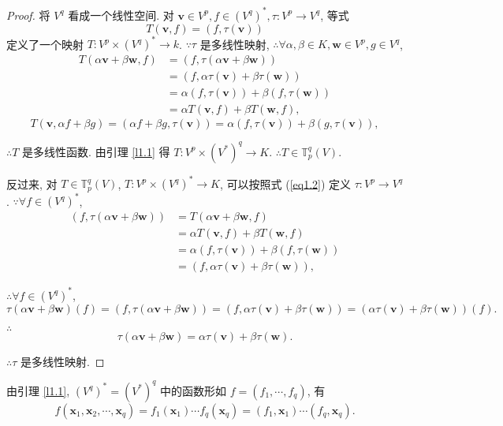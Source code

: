 \documentclass{ctexart}
\begin{document}
\begin{proof}
    将 $V^q$ 看成一个线性空间. 对 $\boldsymbol{v}\in V^p,f\in(V^q)^*,\tau:V^p\to V^q$, 等式
    \begin{equation}\label{eq1.2}
        T(\boldsymbol{v},f)=(f,\tau(\boldsymbol{v}))
    \end{equation}
    定义了一个映射 $T:V^p\times(V^q)^*\to k$. $\because\tau$ 是多线性映射, $\therefore\forall\alpha,\beta\in K,\boldsymbol{w}\in V^p,g\in V^q$,
    \begin{align*}
        T(\alpha\boldsymbol{v}+\beta\boldsymbol{w},f) & =(f,\tau(\alpha\boldsymbol{v}+\beta\boldsymbol{w})) \\
        & =(f,\alpha\tau(\boldsymbol{v})+\beta\tau(\boldsymbol{w})) \\
        & =\alpha(f,\tau(\boldsymbol{v}))+\beta(f,\tau(\boldsymbol{w})) \\
        & =\alpha T(\boldsymbol{v},f)+\beta T(\boldsymbol{w},f),
    \end{align*}
    \[T(\boldsymbol{v},\alpha f+\beta g)=(\alpha f+\beta g,\tau(\boldsymbol{v}))=\alpha(f,\tau(\boldsymbol{v}))+\beta(g,\tau(\boldsymbol{v})),\]

    $\therefore T$ 是多线性函数. 由引理 \ref{l1.1} 得 $T:V^p\times(V^*)^q\to K$. $\therefore T\in\mathbb{T}_p^q(V)$.

    反过来, 对 $T\in\mathbb{T}_p^q(V)$, $T:V^p\times(V^q)^*\to K$, 可以按照式 (\ref{eq1.2}) 定义 $\tau:V^p\to V^q$. $\because\forall f\in(V^q)^*$,
    \begin{align*}
        (f,\tau(\alpha\boldsymbol{v}+\beta\boldsymbol{w})) & =T(\alpha\boldsymbol{v}+\beta\boldsymbol{w},f) \\
        & =\alpha T(\boldsymbol{v},f)+\beta T(\boldsymbol{w},f) \\
        & =\alpha(f,\tau(\boldsymbol{v}))+\beta(f,\tau(\boldsymbol{w})) \\
        & =(f,\alpha\tau(\boldsymbol{v})+\beta\tau(\boldsymbol{w})),
    \end{align*}

    $\therefore\forall f\in(V^q)^*$,
    \[\tau(\alpha\boldsymbol{v}+\beta\boldsymbol{w})(f)=(f,\tau(\alpha\boldsymbol{v}+\beta\boldsymbol{w}))=(f,\alpha\tau(\boldsymbol{v})+\beta\tau(\boldsymbol{w}))=(\alpha\tau(\boldsymbol{v})+\beta\tau(\boldsymbol{w}))(f).\]

    $\therefore$
    \[\tau(\alpha\boldsymbol{v}+\beta\boldsymbol{w})=\alpha\tau(\boldsymbol{v})+\beta\tau(\boldsymbol{w}).\]

    $\therefore\tau$ 是多线性映射.
\end{proof}
由引理 \ref{l1.1}, $(V^q)^*=(V^*)^q$ 中的函数形如 $f=(f_1,\cdots,f_q)$, 有
\[f(\boldsymbol{x}_1,\boldsymbol{x}_2,\cdots,\boldsymbol{x}_q)=f_1(\boldsymbol{x}_1)\cdots f_q(\boldsymbol{x}_q)=(f_1,\boldsymbol{x}_1)\cdots(f_q,\boldsymbol{x}_q).\]
\end{document}
